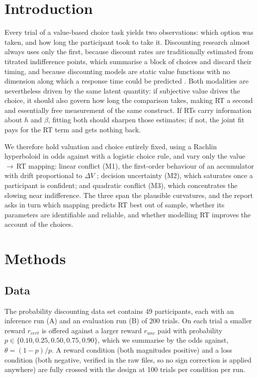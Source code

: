 \documentclass[11pt,a4paper]{article}
\begin{document}
\section{Introduction}

Every trial of a value-based choice task yields two observations: which option was taken, and
how long the participant took to take it. Discounting research almost always uses only the
first, because discount rates are traditionally estimated from titrated indifference points,
which summarise a block of choices and discard their timing, and because discounting models are
static value functions with no dimension along which a response time could be predicted
\citep{green2004}. Both modalities are nevertheless driven by the same latent
quantity: if subjective value drives the choice, it should also govern how long the comparison
takes, making RT a second and essentially free measurement of the same construct. If RTs carry
information about $h$ and $\beta$, fitting both should sharpen those estimates; if not, the
joint fit pays for the RT term and gets nothing back.

We therefore hold valuation and choice entirely fixed, using a Rachlin hyperboloid in odds
against \citep{rachlin1991} with a logistic choice rule, and vary only the value\,$\to$\,RT
mapping: linear conflict (M1), the first-order behaviour of an accumulator with drift
proportional to $\Delta V$ \citep{ratcliff1978,ratcliff2008}; decision uncertainty (M2), which
saturates once a participant is confident; and quadratic conflict (M3), which concentrates the
slowing near indifference. The three span the plausible curvatures, and the report asks in turn
which mapping predicts RT best out of sample, whether its parameters are identifiable and
reliable, and whether modelling RT improves the account of the choices.

\section{Methods}

\subsection{Data}

The probability discounting data set contains 49 participants, each with an inference run (A)
and an evaluation run (B) of 200 trials. On each trial a smaller reward $r_{cert}$ is offered
against a larger reward $r_{unc}$ paid with probability
$p\in\{0.10,0.25,0.50,0.75,0.90\}$, which we summarise by the odds against,
$\theta=(1-p)/p$. A reward condition (both magnitudes positive) and a loss condition (both
negative, verified in the raw files, so no sign correction is applied anywhere) are fully
crossed with the design at 100 trials per condition per run.
\end{document}
